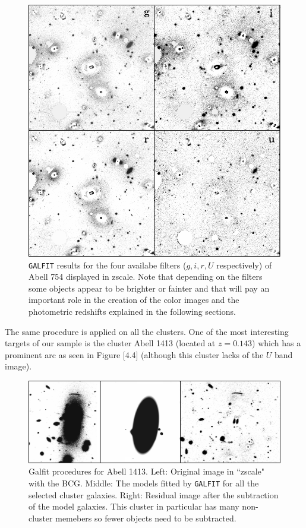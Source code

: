 \begin{figure}[H]
\centering
\includegraphics[width=12cm]{images/filters_A754.png}
\caption[All filters' results for Abell 754]{\texttt{GALFIT} results for the four availabe filters ($g,i,r,U$ respectively) of Abell 754 displayed in zscale. Note that depending on the filters some objects appear to be brighter or fainter and that will pay an important role in the creation of the color images and the photometric redshifts explained in the following sections.}
\end{figure}

The same procedure is applied on all the clusters. One of the most interesting targets of our sample is the cluster Abell 1413 (located at $z=0.143$) which has a prominent arc as seen in Figure [4.4] (although this cluster lacks of the $U$ band image). 

\begin{figure}[H]
\centering
\includegraphics[width=15cm]{images/A1413.png}
\caption[Galfit results for Abell 1413]{Galfit procedures for  Abell 1413. Left: Original image in ``zscale" with the BCG. Middle: The models fitted by \texttt{GALFIT} for all the selected cluster galaxies. Right: Residual image after the subtraction of the model galaxies. This cluster in particular has many non-cluster memebers so fewer objects need to be subtracted.}
\end{figure}

